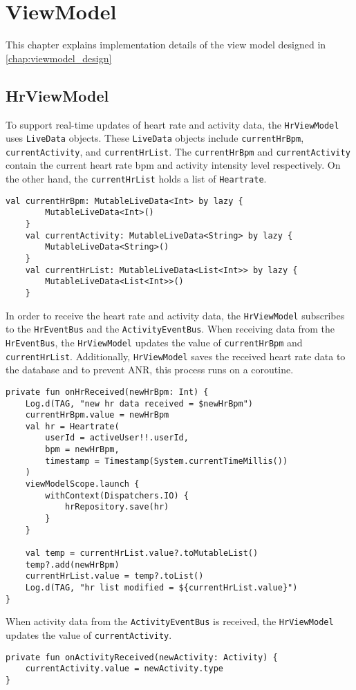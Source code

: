 \section{ViewModel}
This chapter explains implementation details of the view model designed in \autoref{chap:viewmodel_design}

\subsection{HrViewModel}
\label{chap:hrviewmodel_impl}
To support real-time updates of heart rate and activity data, the \verb;HrViewModel; uses \verb;LiveData; objects. These \verb;LiveData; objects include \verb;currentHrBpm;, \verb;currentActivity;, and \verb;currentHrList;.
The \verb;currentHrBpm; and \verb;currentActivity; contain the current heart rate bpm and activity intensity level respectively. On the other hand, the \verb;currentHrList; holds a list of \verb;Heartrate;.
\begin{lstlisting}[caption={LiveData implementation (HrViewModel)}]
    val currentHrBpm: MutableLiveData<Int> by lazy {
        MutableLiveData<Int>()
    }
    val currentActivity: MutableLiveData<String> by lazy {
        MutableLiveData<String>()
    }
    val currentHrList: MutableLiveData<List<Int>> by lazy {
        MutableLiveData<List<Int>>()
    }
\end{lstlisting}

In order to receive the heart rate and activity data, the \verb;HrViewModel; subscribes to the \verb;HrEventBus; and the \verb;ActivityEventBus;. 
When receiving data from the \verb;HrEventBus;, the \verb;HrViewModel; updates the value of \verb;currentHrBpm; and \verb;currentHrList;. 
Additionally, \verb;HrViewModel; saves the received heart rate data to the database and to prevent ANR, this process runs on a coroutine.
\begin{lstlisting}[caption={On heart rate event received (HrViewModel)}]
private fun onHrReceived(newHrBpm: Int) {
    Log.d(TAG, "new hr data received = $newHrBpm")
    currentHrBpm.value = newHrBpm
    val hr = Heartrate(
        userId = activeUser!!.userId,
        bpm = newHrBpm,
        timestamp = Timestamp(System.currentTimeMillis())
    )
    viewModelScope.launch {
        withContext(Dispatchers.IO) {
            hrRepository.save(hr)
        }
    }

    val temp = currentHrList.value?.toMutableList()
    temp?.add(newHrBpm)
    currentHrList.value = temp?.toList()
    Log.d(TAG, "hr list modified = ${currentHrList.value}")
}
\end{lstlisting}
When activity data from the \verb;ActivityEventBus; is received, the \verb;HrViewModel; updates the value of \verb;currentActivity;.
\begin{lstlisting}[caption={On activity event received (HrViewModel)}]
private fun onActivityReceived(newActivity: Activity) {
    currentActivity.value = newActivity.type
}
\end{lstlisting}

